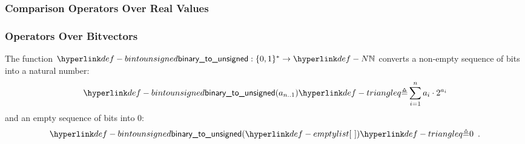 \subsubsection{Comparison Operators Over Real Values \label{sec:ComparisonOverReal}}
\begin{mathpar}
\end{mathpar}

\begin{mathpar}
\end{mathpar}

\begin{mathpar}
\end{mathpar}

\begin{mathpar}
\end{mathpar}

\begin{mathpar}
\end{mathpar}

\begin{mathpar}
\end{mathpar}

\subsubsection{Operators Over Bitvectors \label{sec:BitvectorOperations}}
\hypertarget{def-bintounsigned}{}
The function $\bintounsigned : \{0,1\}^* \rightarrow \N$ converts a non-empty sequence of bits
into a natural number:
\[
  \bintounsigned(a_{n..1}) \triangleq \sum_{i=1}^n a_i \cdot 2^{a_i}
\]
and an empty sequence of bits into $0$:
\[
  \bintounsigned(\emptylist) \triangleq 0 \enspace.
\]

